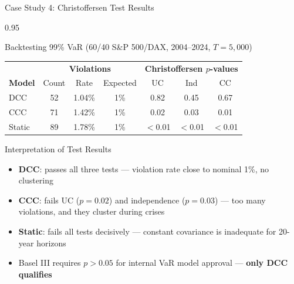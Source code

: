 \documentclass[9pt, aspectratio=169, t]{beamer}
\begin{document}
\begin{frame}{Case Study 4: Christoffersen Test Results}
    \begin{cminipage}{0.95\textwidth}
    {\footnotesize
    \begin{block}{Backtesting 99\% VaR (60/40 S\&P 500/DAX, 2004--2024, $T = 5{,}000$)}
        \vspace{0.1cm}
        {\small
        \begin{center}
        \begin{tabular}{l|ccc|ccc}
            \hline
            & \multicolumn{3}{c|}{\textbf{Violations}} & \multicolumn{3}{c}{\textbf{Christoffersen $p$-values}} \\
            \textbf{Model} & Count & Rate & Expected & UC & Ind & CC \\
            \hline
            DCC    & 52 & 1.04\% & 1\% & 0.82 & 0.45 & 0.67 \\
            CCC    & 71 & 1.42\% & 1\% & 0.02 & 0.03 & 0.01 \\
            Static & 89 & 1.78\% & 1\% & $<$0.01 & $<$0.01 & $<$0.01 \\
            \hline
        \end{tabular}
        \end{center}
        }
    \end{block}
    \begin{alertblock}{Interpretation of Test Results}
        \begin{itemize}\setlength{\itemsep}{0pt}
            \item \textbf{DCC}: passes all three tests --- violation rate close to nominal 1\%, no clustering
            \item \textbf{CCC}: fails UC ($p = 0.02$) and independence ($p = 0.03$) --- too many violations, and they cluster during crises
            \item \textbf{Static}: fails all tests decisively --- constant covariance is inadequate for 20-year horizons
            \item Basel III requires $p > 0.05$ for internal VaR model approval --- \textbf{only DCC qualifies}
        \end{itemize}
    \end{alertblock}
    }
    \end{cminipage}
\end{frame}
\end{document}
